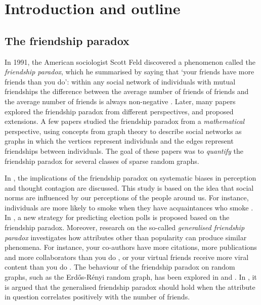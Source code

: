 \documentclass[11pt]{article}
\numberwithin{equation}{section}
\theoremstyle{plain}
\begin{document}

\newpage
\scriptsize
\tableofcontents
\normalsize




\section{Introduction and outline}
\label{sec:intro}


\subsection{The friendship paradox}

In 1991, the American sociologist Scott Feld discovered a phenomenon called the \emph{friendship paradox}, which he summarised by saying that `your friends have more friends than you do': within any social network of individuals with mutual friendships the difference between the average number of friends of friends and the average number of friends is always non-negative \cite{SF}. Later, many papers explored the friendship paradox from different perspectives, and proposed extensions. A few papers studied the friendship paradox from a \emph{mathematical} perspective, using concepts from graph theory to describe social networks as graphs in which the vertices represent individuals and the edges represent friendships between individuals. The goal of these papers was to \emph{quantify} the friendship paradox for several classes of sparse random graphs.  

In \cite{J}, the implications of the friendship paradox on systematic biases in perception and thought contagion are discussed. This study is based on the idea that social norms are influenced by our perceptions of the people around us. For instance, individuals are more likely to smoke when they have acquaintances who smoke \cite{CF}. In \cite{NK}, a new strategy for predicting election polls is proposed based on the friendship paradox. Moreover, research on the so-called \emph{generalised friendship paradox} investigates how attributes other than popularity can produce similar phenomena. For instance, your co-authors have more citations, more publications and more collaborators than you do \cite{EJ}, or your virtual friends receive more viral content than you do \cite{HKL}. The behaviour of the friendship paradox on random graphs, such as the Erd\H{o}s-R\'enyi random graph, has been explored in \cite{CKN} and \cite{PYNSB}. In \cite{CKN}, it is argued that the generalised friendship paradox should hold when the attribute in question correlates positively with the number of friends.
\end{document}
